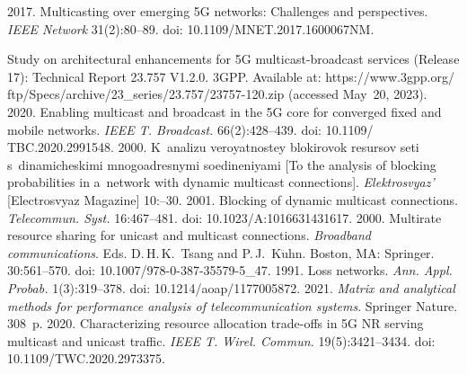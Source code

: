 \begin{multicols}{2}
{{\begin{thebibliography}{99}
   2017. Multicasting 
over emerging 5G networks: Challenges and perspectives. \textit{IEEE Network} 31(2):80--89. doi: 
10.1109/MNET.2017.1600067NM.

  Study on architectural enhancements for 5G multicast-broadcast services (Release 17): Technical 
Report 23.757 V1.2.0. 3GPP. Available at:  {\sf 
https://www.3gpp.org/ ftp/Specs/archive/23\_series/23.757/23757-120.zip} (accessed May~20, 2023).
   2020. Enabling multicast and broadcast in the 
5G core for converged fixed and mobile networks. \textit{IEEE T. Broadcast.} 66(2):428--439. doi: 
10.1109/ TBC.2020.2991548.
   2000. K~analizu ve\-ro\-yat\-no\-stey blokirovok 
resursov seti s~dinamicheskimi mno\-go\-ad\-res\-ny\-mi so\-edi\-ne\-ni\-yami [To the analysis of blocking 
probabilities in a~network with dynamic multicast connections]. \textit{Elektrosvyaz'}  
[Electrosvyaz Magazine] 10:--30.
   2001. Blocking of dynamic 
multicast connections. \textit{Telecommun. Syst.} 16:467--481. doi: 10.1023/A:1016631431617.
   2000. Multirate resource sharing for unicast and 
multicast connections. \textit{Broadband communications}. Eds. D.\,H.\,K.~Tsang and P.\,J.~K$\ddot{\mbox{u}}$hn.
Boston, MA: Springer. 30:561--570. doi: 10.1007/978-0-387-35579-5\_47.
   1991. Loss networks. \textit{Ann. Appl. Probab.} 1(3):319--378. doi: 
10.1214/aoap/1177005872.
   2021. \textit{Matrix and 
analytical methods for performance analysis of telecommunication systems}. Springer Nature. 
308~p.
   2020. Characterizing resource allocation 
trade-offs in 5G NR serving multicast and unicast traffic. \textit{IEEE T. Wirel. Commun.}  
19(5):3421--3434. doi: 10.1109/TWC.2020.2973375.
  \end{thebibliography}

 }
 }

\end{multicols}

